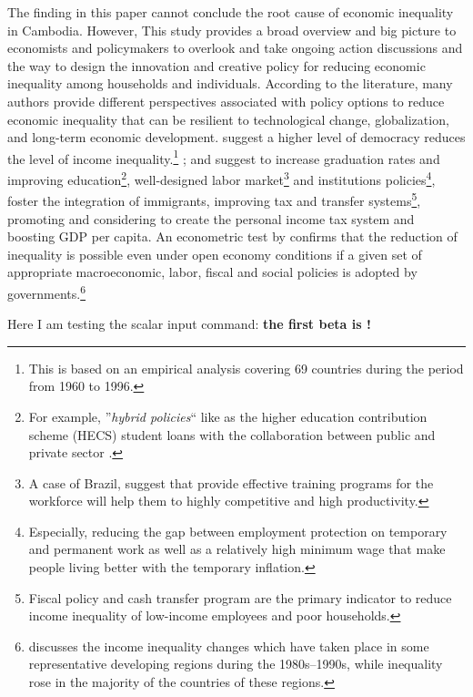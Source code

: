 \documentclass[11pt]{article}
\newcommand*{\TablesPath}{./tables/} %
\newcommand{\scalarinput}[1]{\DTLfetch{scalars}{thekey}{##1}{thevalue}}%
\newcommand{\scalarinput}[1]{\texttt{##1}}%
\begin{document}
The finding in this paper cannot conclude the root cause of economic inequality in Cambodia. However, This study provides a broad overview and big picture to economists and policymakers to overlook and take ongoing action discussions and the way to design the innovation and creative policy for reducing economic inequality among households and individuals. According to the literature, many authors provide different perspectives associated with policy options to reduce economic inequality that can be resilient to technological change, globalization, and long-term economic development. \citet{Herran2005} suggest a higher level of democracy reduces the level of income inequality.\footnote{This is based on an empirical analysis covering 69 countries during the period from 1960 to 1996.} \citet{Bastagli2012, Breunig2019}; and \citet{Bastagli2012} suggest to increase graduation rates and improving education\footnote{For example, ''\textit{hybrid policies}`` like as the higher education contribution scheme (HECS) student loans with the collaboration between public and private sector \cite{Breunig2019}.}, well-designed labor market\footnote{A case of Brazil, \citet{Herran2005} suggest that provide effective training programs for the workforce will help them to highly competitive and high productivity.} and institutions policies\footnote{Especially, reducing the gap between employment protection on temporary and permanent work as well as a relatively high minimum wage that make people living better with the temporary inflation.}, foster the integration of immigrants, improving tax and transfer systems\footnote{Fiscal policy and cash transfer program are the primary indicator to reduce income inequality of low-income employees and poor households.}, promoting and considering to create the personal income tax system and boosting GDP per capita. An econometric test by \citet{GIZ2015} confirms that the reduction of inequality is possible even under open economy conditions if a given set of appropriate macroeconomic, labor, fiscal and social policies is adopted by governments.\footnote{\citet{GIZ2015} discusses the income inequality changes which have taken place in some representative developing regions during the 1980s--1990s, while inequality rose in the majority of the countries of these regions.}

Here I am testing the scalar input command: \textbf{the first beta is \scalarinput{first.value.beta}!}

\blindtext[2]


\end{document}
